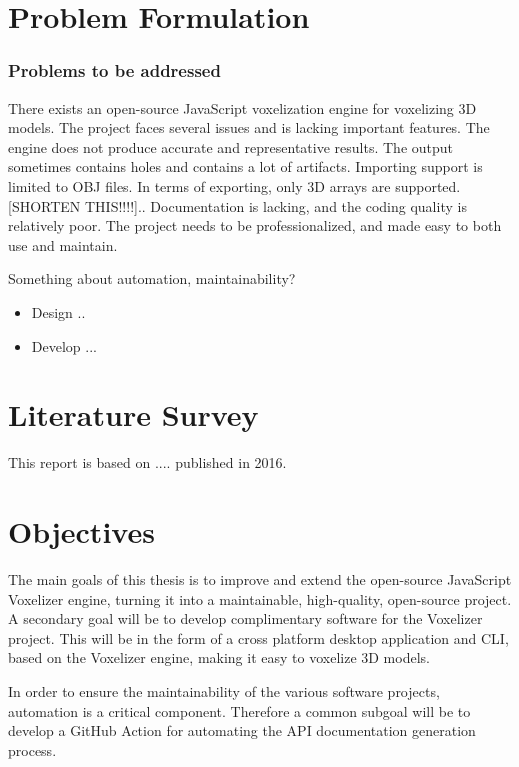 \section{Problem Formulation}

\subsubsection{Problems to be addressed}
There exists an open-source JavaScript voxelization engine for voxelizing 3D models. The project faces several issues and is lacking important features. The engine does not produce accurate and representative results. The output sometimes contains holes and contains a lot of artifacts. Importing support is limited to OBJ files. In terms of exporting, only 3D arrays are supported. [SHORTEN THIS!!!!].. Documentation is lacking, and the coding quality is relatively poor. The project needs to be professionalized, and made easy to both use and maintain.

Something about automation, maintainability?

\begin{itemize}
\item Design ..
\item Develop ...
\end{itemize}

\section{Literature Survey}
This report is based on ....  published in 2016.
\section{Objectives}
The main goals of this thesis is to improve and extend the open-source JavaScript Voxelizer engine, turning it into a maintainable, high-quality, open-source project. A secondary goal will be to develop complimentary software for the Voxelizer project. This will be in the form of a cross platform desktop application and CLI, based on the Voxelizer engine, making it easy to voxelize 3D models.

In order to ensure the maintainability of the various software projects, automation is a critical component. Therefore a common subgoal will be to develop a GitHub Action for automating the API documentation generation process.

